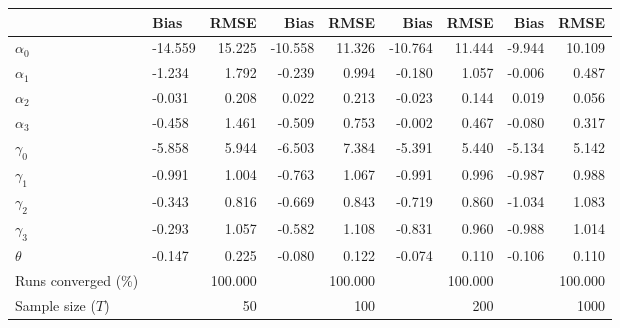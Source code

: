
\begin{tabular}[t]{llrrrrrrr}
\toprule
  & Bias & RMSE & Bias & RMSE & Bias & RMSE & Bias & RMSE\\
\midrule
$\alpha_{0}$ & -14.559 & 15.225 & -10.558 & 11.326 & -10.764 & 11.444 & -9.944 & 10.109\\
$\alpha_{1}$ & -1.234 & 1.792 & -0.239 & 0.994 & -0.180 & 1.057 & -0.006 & 0.487\\
$\alpha_{2}$ & -0.031 & 0.208 & 0.022 & 0.213 & -0.023 & 0.144 & 0.019 & 0.056\\
$\alpha_{3}$ & -0.458 & 1.461 & -0.509 & 0.753 & -0.002 & 0.467 & -0.080 & 0.317\\
$\gamma_{0}$ & -5.858 & 5.944 & -6.503 & 7.384 & -5.391 & 5.440 & -5.134 & 5.142\\
$\gamma_{1}$ & -0.991 & 1.004 & -0.763 & 1.067 & -0.991 & 0.996 & -0.987 & 0.988\\
$\gamma_{2}$ & -0.343 & 0.816 & -0.669 & 0.843 & -0.719 & 0.860 & -1.034 & 1.083\\
$\gamma_{3}$ & -0.293 & 1.057 & -0.582 & 1.108 & -0.831 & 0.960 & -0.988 & 1.014\\
$\theta$ & -0.147 & 0.225 & -0.080 & 0.122 & -0.074 & 0.110 & -0.106 & 0.110\\
Runs converged (\%) &  & 100.000 &  & 100.000 &  & 100.000 &  & 100.000\\
Sample size ($T$) &  & 50 &  & 100 &  & 200 &  & 1000\\
\bottomrule
\end{tabular}
